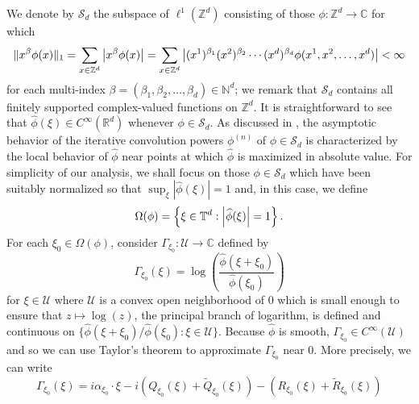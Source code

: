 \documentclass[11pt]{article}
\theoremstyle{remark}
\begin{document}
We denote by $\mathcal{S}_d$ the subspace of $\ell^1(\mathbb{Z}^d)$ consisting of those $\phi:\mathbb{Z}^d\to\mathbb{C}$ for which
\begin{equation*}
    \|x^\beta \phi(x)\|_1=\sum_{x\in\mathbb{Z}^d}\abs{x^\beta\phi(x)}=\sum_{x\in\mathbb{Z}^d}\abs{(x^1)^{\beta_1}(x^2)^{\beta_2}\cdots(x^d)^{\beta_d}\phi(x^1,x^2,\dots,x^d)}<\infty
\end{equation*}
for each multi-index $\beta=(\beta_1,\beta_2,\dots,\beta_d)\in\mathbb{N}^d$; we remark that $\mathcal{S}_d$ contains all finitely supported complex-valued functions on $\mathbb{Z}^d$. It is straightforward to see that $\widehat{\phi}(\xi)\in C^\infty(\mathbb{R}^d)$ whenever $\phi\in \mathcal{S}_d$. As discussed in \cite{Thomee1965,DSC2014,Randles2015,Randles2017}, the asymptotic behavior of the iterative convolution powers $\phi^{(n)}$ of $\phi\in\mathcal{S}_d$ is characterized by the local behavior of $\widehat{\phi}$ near points at which $\widehat{\phi}$ is maximized in absolute value. For simplicity of our analysis, we shall focus on those $\phi\in\mathcal{S}_d$ which have been suitably normalized so that $\sup_{\xi}|\widehat{\phi}(\xi)|=1$ and, in this case, we define
\begin{equation*}
    \Omega(\phi)=\left\{\xi\in \mathbb{T}^d:\abs{\widehat{\phi}(\xi)}=1\right\}.
\end{equation*}
For each $\xi_0\in \Omega(\phi)$, consider $\Gamma_{\xi_0}:\mathcal{U}\to\mathbb{C}$ defined by
\begin{equation*}\Gamma_{\xi_0}(\xi)=\log\left(\frac{\widehat{\phi}(\xi+\xi_0)}{\widehat{\phi}(\xi_0)}\right)
\end{equation*}
for $\xi\in \mathcal{U}$ where $\mathcal{U}$ is a convex open neighborhood of $0$ which is small enough to ensure that $z\mapsto\log(z)$, the principal branch of logarithm, is defined and continuous on $\{\widehat{\phi}(\xi+\xi_0)/\widehat{\phi}(\xi_0):\xi\in\mathcal{U}\}$. Because $\widehat{\phi}$ is smooth, $\Gamma_{\xi_0}\in C^{\infty}(\mathcal{U})$ and so we can use Taylor's theorem to approximate $\Gamma_{\xi_0}$ near $0$. More precisely, we can write
\begin{equation}\label{eq:GammaExpansion}
    \Gamma_{\xi_0}(\xi)=i\alpha_{\xi_0}\cdot\xi -i\left(Q_{\xi_0}(\xi)+\widetilde{Q}_{\xi_0}(\xi)\right)-\left(R_{\xi_0}(\xi)+\widetilde{R}_{\xi_0}(\xi)\right)
\end{equation}
\end{document}
